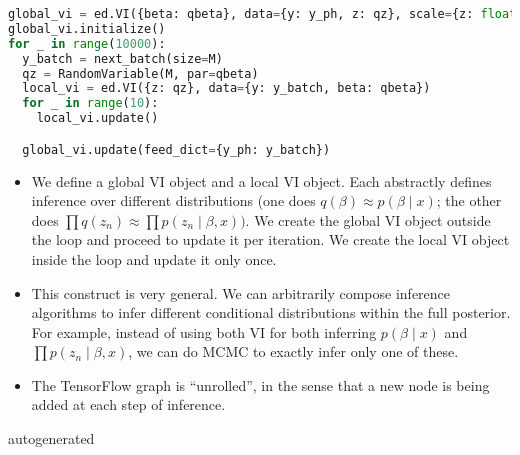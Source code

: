 \begin{lstlisting}[language=Python]
global_vi = ed.VI({beta: qbeta}, data={y: y_ph, z: qz}, scale={z: float(N)/M})
global_vi.initialize()
for _ in range(10000):
  y_batch = next_batch(size=M)
  qz = RandomVariable(M, par=qbeta)
  local_vi = ed.VI({z: qz}, data={y: y_batch, beta: qbeta})
  for _ in range(10):
    local_vi.update()

  global_vi.update(feed_dict={y_ph: y_batch})
\end{lstlisting}
\begin{itemize}
\item
  We define a global VI object and a local VI object. Each abstractly
  defines inference over different distributions (one does $q(\beta)
  \approx p(\beta \mid x)$; the other does $\prod q(z_n) \approx \prod
  p(z_n \mid \beta, x))$. We create the global VI object outside the loop
  and proceed to update it per iteration. We create the local VI
  object inside the loop and update it only once.
\item
  This construct is very general. We can arbitrarily compose inference
  algorithms to infer different conditional distributions within the
  full posterior. For example, instead of using both VI for both
  inferring $p(\beta \mid x)$ and $\prod p(z_n \mid \beta, x)$, we can do
  MCMC to exactly infer only one of these.
\item
  The TensorFlow graph is ``unrolled'', in the sense that a new node is
  being added at each step of inference.
\end{itemize}

{{autogenerated}}
